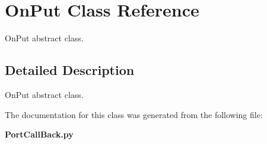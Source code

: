 \section{On\-Put Class Reference}
\label{classOnPut}
On\-Put abstract class.  




\subsection{Detailed Description}
On\-Put abstract class. 



The documentation for this class was generated from the following file:\begin{CompactItemize}
\item 
{\bf Port\-Call\-Back.py}\end{CompactItemize}

